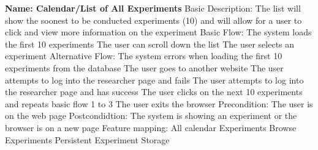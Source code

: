 \begin{outline}[enumerate]
\1 {\bf Name: Calendar/List of All Experiments}
\2 Basic Description: The list will show the soonest to be conducted experiments (10) and will allow for a user to click and view more information on the experiment
\2 Basic Flow:
\3 The system loads the first 10 experiments
\3 The user can scroll down the list
\3 The user selects an experiment
\2 Alternative Flow:
\3The system errors when loading the first 10 experiments from the database
\3 The user goes to another website
\3 The user attempts to log into the researcher page and fails
\3 The user attempts to log into the researcher page and has success
\3 The user clicks on the next 10 experiments and repeats basic flow 1 to 3
\3 The user exits the browser
\2 Precondition:
\3 The user is on the web page
\2 Postcondidtion:
\3 The system is showing an experiment or the browser is on a new page
\2 Feature mapping:
\3 All calendar Experiments
\3 Browse Experiments
\3 Persistent Experiment Storage



\end{outline}
